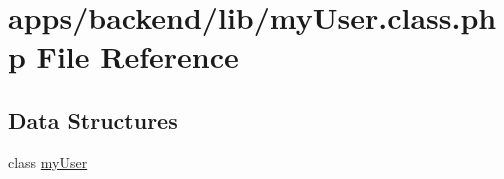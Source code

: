 \hypertarget{backend_2lib_2my_user_8class_8php}{\section{apps/backend/lib/my\-User.class.\-php File Reference}
\label{backend_2lib_2my_user_8class_8php}
}
\subsection*{Data Structures}
\begin{DoxyCompactItemize}
\item 
class \hyperlink{classmy_user}{my\-User}
\end{DoxyCompactItemize}
